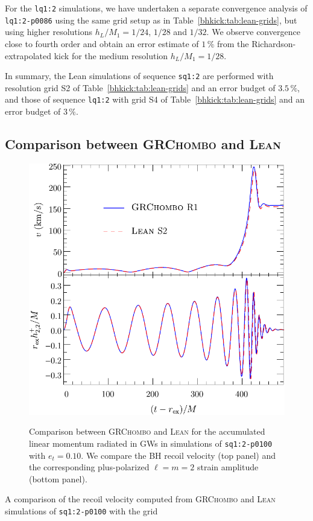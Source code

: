 For the \texttt{lq1:2} simulations, we have undertaken a separate
convergence analysis of \texttt{lq1:2-p0086} using the same grid
setup as in
Table~\ref{bhkick:tab:lean-grids}, but using higher resolutions
$h_L/M_1=1/24$, $1/28$ and $1/32$. We observe convergence close to
fourth order and obtain an error estimate of $1\,\%$ from
the Richardson-extrapolated kick for the medium resolution
$h_L/M_1=1/28$.

In summary, the {\sc Lean} simulations of sequence \texttt{sq1:2} are
performed with resolution grid S2 of Table~\ref{bhkick:tab:lean-grids} and an
error budget of $3.5\,\%$, and those of sequence \texttt{lq1:2} with
grid S4 of Table~\ref{bhkick:tab:lean-grids} and an error budget of $3\,\%$.

\subsection{Comparison between \textsc{GRChombo} and \textsc{Lean}}
\label{bhkick:sec:code-comparison}
\begin{figure}[t]
    {
    \centering
    \includegraphics[width=0.7\columnwidth]{bhkick/grchombo-lean-comparison3.pdf}
    }
    \caption{Comparison between \textsc{GRChombo} and \textsc{Lean} 
    for the accumulated linear momentum radiated in GWs in simulations 
    of \texttt{sq1:2-p0100} with $e_t=0.10$.
    We compare the BH recoil velocity (top panel)
    and the corresponding plus-polarized $\ell=m=2$ strain
    amplitude (bottom panel).
    }
    \label{bhkick:fig:grchombo-lean-comparison}
\end{figure}
A comparison of the recoil velocity computed from \textsc{GRChombo} 
and \textsc{Lean} simulations of \texttt{sq1:2-p0100} with the grid 
